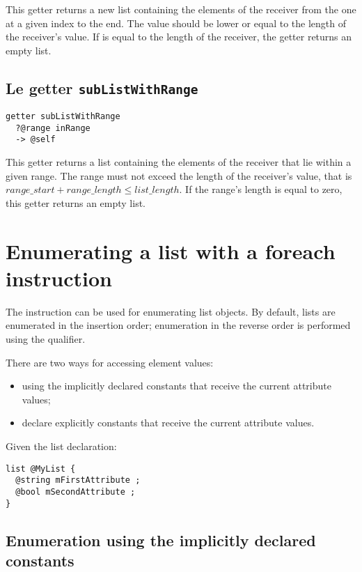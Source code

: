 This getter returns a new list containing the elements of the receiver from the one at a given index to the end. The   value should be lower or equal to the length of the receiver's value. If  is equal to the length of the receiver, the getter returns an empty list.


\subsection{Le getter \texttt{subListWithRange}}

\begin{lstlisting}[language=galgas]
getter subListWithRange
  ?@range inRange
  -> @self
\end{lstlisting}

This getter returns a list containing the elements of the receiver that lie within a given range. The range must not exceed the length of the receiver's value, that is $range\_start + range\_length \leqslant list\_length$. If the range's length is equal to zero, this getter returns an empty list.





\section{Enumerating a list with a foreach instruction}

The  instruction can be used for enumerating list objects. By default, lists are enumerated in the insertion order; enumeration in the reverse order is performed using the \galgas{>} qualifier.

There are two ways for accessing element values:
\begin{itemize}
\item using the implicitly declared constants that receive the current attribute values;
\item declare explicitly constants that receive the current attribute values.
\end{itemize}

Given the list declaration:

\begin{lstlisting}[language=galgas]
list @MyList {
  @string mFirstAttribute ;
  @bool mSecondAttribute ;
}
\end{lstlisting}

\subsection{Enumeration using the implicitly declared constants}

